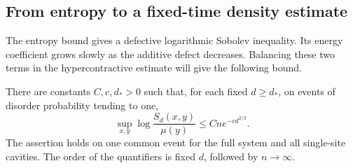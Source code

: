 \subsection{From entropy to a fixed-time density estimate}

The entropy bound gives a defective logarithmic Sobolev inequality.
Its energy coefficient grows slowly as the additive defect decreases.
Balancing these two terms in the hypercontractive estimate will give
the following bound.

\begin{proposition}\label{prop:stat-density}
There are constants $C,c,d_*>0$ such that, for each fixed $d\ge d_*$,
on events of disorder probability tending to one,
\begin{equation}\label{eq:stat-density}
 \sup_{x,y}\log\frac{S_d(x,y)}{\mu(y)}
       \le Cn e^{-c d^{2/3}}.
\end{equation}
The assertion holds on one common event for the full system and all
single-site cavities.  The order of the quantifiers is fixed $d$, followed
by $n\to\infty$.
\end{proposition}

